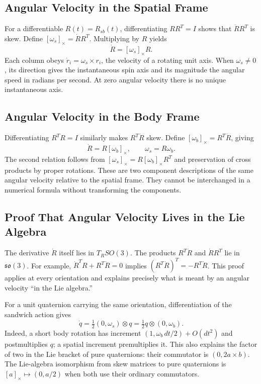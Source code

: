 \subsection{Angular Velocity in the Spatial Frame}
\label{thm:matrix_derivative_spatial}

For a differentiable $R(t)=R_{sb}(t)$, differentiating $RR^T=I$ shows that $\dot RR^T$ is skew. Define $[\omega_s]_\times=\dot RR^T$. Multiplying by $R$ yields
\begin{equation}
 \dot R=[\omega_s]_\times R.
 \label{eq:R_dot_spatial}
\end{equation}
Each column obeys $\dot r_i=\omega_s\times r_i$, the velocity of a rotating unit axis. When $\omega_s\ne0$, its direction gives the instantaneous spin axis and its magnitude the angular speed in radians per second. At zero angular velocity there is no unique instantaneous axis.

\subsection{Angular Velocity in the Body Frame}

Differentiating $R^TR=I$ similarly makes $R^T\dot R$ skew. Define $[\omega_b]_\times=R^T\dot R$, giving
\begin{equation}
 \dot R=R[\omega_b]_\times,\qquad \omega_s=R\omega_b.
 \label{eq:R_dot_body}
\end{equation}
The second relation follows from $[\omega_s]_\times=R[\omega_b]_\times R^T$ and preservation of cross products by proper rotations. These are two component descriptions of the same angular velocity relative to the spatial frame. They cannot be interchanged in a numerical formula without transforming the components.

\subsection{Proof That Angular Velocity Lives in the Lie Algebra}
\label{thm:angular_velocity_so3}

The derivative $\dot R$ itself lies in $T_RSO(3)$. The products $R^T\dot R$ and $\dot RR^T$ lie in $\mathfrak{so}(3)$. For example, $\dot R^TR+R^T\dot R=0$ implies $(R^T\dot R)^T=-R^T\dot R$. This proof applies at every orientation and explains precisely what is meant by an angular velocity ``in the Lie algebra.''

For a unit quaternion carrying the same orientation, differentiation of the sandwich action gives
\begin{equation}
 \dot q=\tfrac 12(0,\omega_s)\otimes q
       =\tfrac 12q\otimes(0,\omega_b).
 \label{eq:quaternion_kinematics}
\end{equation}
Indeed, a short body rotation has increment $(1,\omega_b\,dt/2)+O(dt^2)$ and postmultiplies $q$; a spatial increment premultiplies it. This also explains the factor of two in the Lie bracket of pure quaternions: their commutator is $(0,2a\times b)$. The Lie-algebra isomorphism from skew matrices to pure quaternions is $[a]_\times\mapsto(0,a/2)$ when both use their ordinary commutators.

